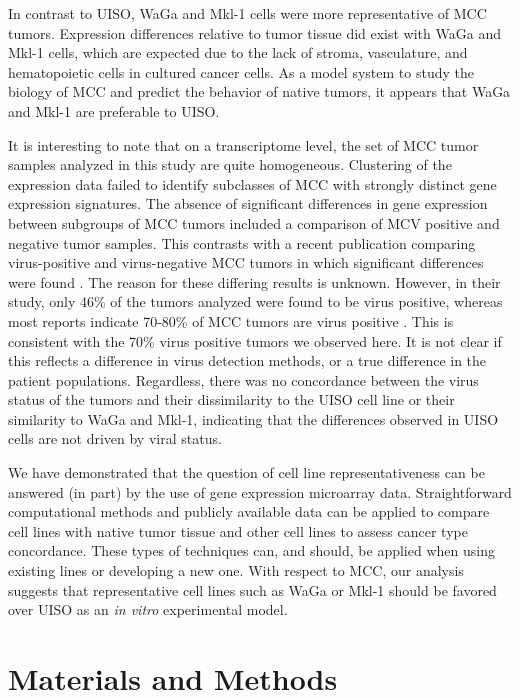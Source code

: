 \documentclass[10pt]{article}
\begin{document}
In contrast to UISO, WaGa and Mkl-1 cells were more representative of MCC tumors.
Expression differences relative to tumor tissue did exist with WaGa and Mkl-1 cells, which are expected due to the lack of stroma, vasculature, and hematopoietic cells in cultured cancer cells.
As a model system to study the biology of MCC and predict the behavior of native tumors, it appears that WaGa and Mkl-1 are preferable to UISO.

It is interesting to note that on a transcriptome level, the set of MCC tumor samples analyzed in this study are quite homogeneous.
Clustering of the expression data failed to identify subclasses of MCC with strongly distinct gene expression signatures.
The absence of significant differences in gene expression between subgroups of MCC tumors included a comparison of MCV positive and negative tumor samples.
This contrasts with a recent publication comparing virus-positive and virus-negative MCC tumors in which significant differences were found \citep{Harms2013Distinct}.
The reason for these differing results is unknown.
However, in their study, only 46\% of the tumors analyzed were found to be virus positive, whereas most reports indicate 70-80\% of MCC tumors are virus positive \citep{Pulitzer2009Merkel,Feng2008Clonal}.
This is consistent with the 70\% virus positive tumors we observed here.
It is not clear if this reflects a difference in virus detection methods, or a true difference in the patient populations.
Regardless, there was no concordance between the virus status of the tumors and their dissimilarity to the UISO cell line or their similarity to WaGa and Mkl-1, indicating that the differences observed in UISO cells are not driven by viral status.

We have demonstrated that the question of cell line representativeness can be answered (in part) by the use of gene expression microarray data.
Straightforward computational methods and publicly available data can be applied to compare cell lines with native tumor tissue and other cell lines to assess cancer type concordance.
These types of techniques can, and should, be applied when using existing lines or developing a new one.
With respect to MCC, our analysis suggests that representative cell lines such as WaGa or Mkl-1 should be favored over UISO as an \emph{in vitro} experimental model.

\section*{Materials and Methods}
\end{document}
